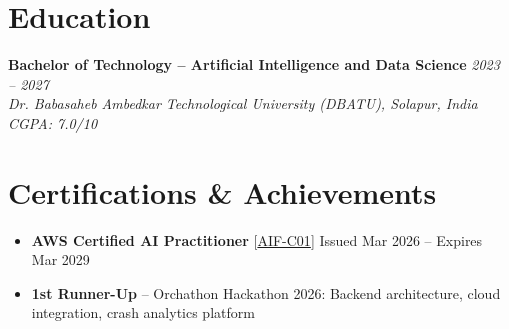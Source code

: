 \documentclass[10pt,a4paper]{article}
\begin{document}
\vspace{-4pt}
\section*{Education}
\vspace{1pt}
\noindent\textbf{Bachelor of Technology -- Artificial Intelligence and Data Science} \hfill \textit{2023 -- 2027} \\
\textit{Dr. Babasaheb Ambedkar Technological University (DBATU), Solapur, India} \hfill \textit{CGPA: 7.0/10}

\vspace{-2pt}
\section*{Certifications \& Achievements}
\begin{itemize}
    \item \textbf{AWS Certified AI Practitioner} [\href{https://www.credly.com/badges/54f5cf90-586c-4237-872c-1870397088a0}{AIF-C01}] \hfill {\small Issued Mar 2026 -- Expires Mar 2029}
    \item \textbf{1st Runner-Up} -- Orchathon Hackathon 2026: Backend architecture, cloud integration, crash analytics platform
\end{itemize}
\end{document}
